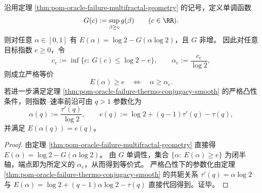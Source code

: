 \begin{corollary}\label{cor:pom-oracle-failure-exponent-inverse-design}
沿用定理 \ref{thm:pom-oracle-failure-multifractal-geometry} 的记号，定义单调函数
\[
G(c):=\sup_{\beta\ge c} g(\beta)\qquad(c\in\RR).
\]
则对任意 \(\alpha\in[0,1]\) 有 \(E(\alpha)=\log 2-G(\alpha\log 2)\)，且 \(G\) 非增。
因此对任意目标指数 \(e\ge 0\)，令
\[
c_e:=\inf\bigl\{c:\ G(c)\le \log 2-e\bigr\},
\qquad
\alpha_e:=\frac{c_e}{\log 2},
\]
则成立严格等价
\[
E(\alpha)\ge e\quad\Longleftrightarrow\quad \alpha\ge \alpha_e.
\]
若进一步满足定理 \ref{thm:pom-oracle-failure-thermo-conjugacy-smooth} 的严格凸性条件，则指数--速率前沿可由 \(q>1\) 参数化为
\[
\alpha(q):=\frac{\tau'(q)}{\log 2},
\qquad
e(q):=\log 2+(q-1)\tau'(q)-\tau(q),
\]
并满足 \(E(\alpha(q))=e(q)\)。
\end{corollary}
\begin{proof}
由定理 \ref{thm:pom-oracle-failure-multifractal-geometry} 直接得 \(E(\alpha)=\log 2-G(\alpha\log 2)\)。
由 \(G\) 单调性，集合 \(\{\alpha:\ E(\alpha)\ge e\}\) 为闭半轴，端点即为所定义的 \(\alpha_e\)，从而得到等价式。
严格凸性下的参数化由定理 \ref{thm:pom-oracle-failure-thermo-conjugacy-smooth} 的共轭关系 \(\tau'(q)=\alpha\log 2\) 与 \(E(\alpha)=\log 2+(q-1)\alpha\log 2-\tau(q)\) 直接代回得到。证毕。
\end{proof}

\endinput
